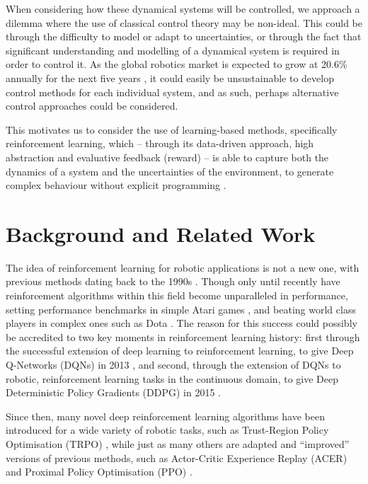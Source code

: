 When considering how these dynamical systems will be controlled, we approach a dilemma where the use of classical control theory may be non-ideal. This could be through the difficulty to model or adapt to uncertainties, or through the fact that significant understanding and modelling of a dynamical system is required in order to control it. As the global robotics market is expected to grow at 20.6\% annually for the next five years \cite{roboticsMarket}, it could easily be unsustainable to develop control methods for each individual system, and as such, perhaps alternative control approaches could be considered.

This motivates us to consider the use of learning-based methods, specifically reinforcement learning, which -- through its data-driven approach, high abstraction and evaluative feedback (reward) -- is able to capture both the dynamics of a system and the uncertainties of the environment, to generate complex behaviour without explicit programming \cite{TTK23, RLinRoboticsSurvey}.

\section{Background and Related Work}

The idea of reinforcement learning for robotic applications is not a new one, with previous methods dating back to the 1990s \cite{Gullapalli1994, Miyamoto1996}.
Though only until recently have reinforcement algorithms within this field become unparalleled in performance, setting performance benchmarks in simple Atari games  \cite{mnih2013Atari}, and beating world class players in complex ones such as Dota \cite{ppoOnDota2020}. 
The reason for this success could possibly be accredited to two key moments in reinforcement learning history: first through the successful extension of deep learning to reinforcement learning, to give Deep Q-Networks (DQNs) in 2013 \cite{mnih2013Atari, DQN}, and second, through the extension of DQNs to robotic, reinforcement learning tasks in the continuous domain, to give Deep Deterministic Policy Gradients (DDPG) in 2015 \cite{DDPG}.

Since then, many novel deep reinforcement learning algorithms have been introduced for a wide variety of robotic tasks, such as Trust-Region Policy Optimisation (TRPO) \cite{TRPO}, while just as many others are adapted and ``improved'' versions of previous methods, such as Actor-Critic Experience Replay (ACER) and Proximal Policy Optimisation (PPO) \cite{ACER, PPO}.

